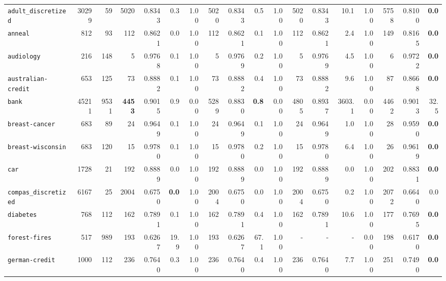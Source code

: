 \begin{tabular}{lccrrrrrrrrrrrrrrr}
\texttt{adult\_discretized} & \multicolumn{1}{r}{30299} & \multicolumn{1}{r}{59}  & 5020 & 0.8343 & 0.3 & 1.00 & 5020 & 0.8343 & 0.5 & 1.00 & 5020 & 0.8343 & 10.1 & 1.00 & 5758 & 0.8100 & \textbf{0.0}\\
\texttt{anneal} & \multicolumn{1}{r}{812} & \multicolumn{1}{r}{93}  & 112 & 0.8621 & 0.0 & 1.00 & 112 & 0.8621 & 0.1 & 1.00 & 112 & 0.8621 & 2.4 & 1.00 & 149 & 0.8165 & \textbf{0.0}\\
\texttt{audiology} & \multicolumn{1}{r}{216} & \multicolumn{1}{r}{148}  & 5 & 0.9768 & 0.1 & 1.00 & 5 & 0.9769 & 0.2 & 1.00 & 5 & 0.9769 & 4.5 & 1.00 & 6 & 0.9722 & \textbf{0.0}\\
\texttt{australian-credit} & \multicolumn{1}{r}{653} & \multicolumn{1}{r}{125}  & 73 & 0.8882 & 0.1 & 1.00 & 73 & 0.8882 & 0.4 & 1.00 & 73 & 0.8882 & 9.6 & 1.00 & 87 & 0.8668 & \textbf{0.0}\\
\texttt{bank} & \multicolumn{1}{r}{45211} & \multicolumn{1}{r}{9531}  & \textbf{4453} & 0.9015 & 0.9 & 0.00 & 5289 & 0.8830 & \textbf{0.8} & 0.00 & 4805 & 0.8937 & 3603.1 & 0.00 & 4462 & 0.9013 & 32.5\\
\texttt{breast-cancer} & \multicolumn{1}{r}{683} & \multicolumn{1}{r}{89}  & 24 & 0.9649 & 0.1 & 1.00 & 24 & 0.9649 & 0.1 & 1.00 & 24 & 0.9649 & 1.0 & 1.00 & 28 & 0.9590 & \textbf{0.0}\\
\texttt{breast-wisconsin} & \multicolumn{1}{r}{683} & \multicolumn{1}{r}{120}  & 15 & 0.9780 & 0.1 & 1.00 & 15 & 0.9780 & 0.2 & 1.00 & 15 & 0.9780 & 6.4 & 1.00 & 26 & 0.9619 & \textbf{0.0}\\
\texttt{car} & \multicolumn{1}{r}{1728} & \multicolumn{1}{r}{21}  & 192 & 0.8889 & 0.0 & 1.00 & 192 & 0.8889 & 0.0 & 1.00 & 192 & 0.8889 & 0.0 & 1.00 & 202 & 0.8831 & \textbf{0.0}\\
\texttt{compas\_discretized} & \multicolumn{1}{r}{6167} & \multicolumn{1}{r}{25}  & 2004 & 0.6750 & \textbf{0.0} & 1.00 & 2004 & 0.6750 & 0.0 & 1.00 & 2004 & 0.6750 & 0.2 & 1.00 & 2072 & 0.6640 & 0.0\\
\texttt{diabetes} & \multicolumn{1}{r}{768} & \multicolumn{1}{r}{112}  & 162 & 0.7891 & 0.1 & 1.00 & 162 & 0.7891 & 0.4 & 1.00 & 162 & 0.7891 & 10.6 & 1.00 & 177 & 0.7695 & \textbf{0.0}\\
\texttt{forest-fires} & \multicolumn{1}{r}{517} & \multicolumn{1}{r}{989}  & 193 & 0.6267 & 19.9 & 1.00 & 193 & 0.6267 & 67.1 & 1.00 & - & - & - & 0.00 & 198 & 0.6170 & \textbf{0.0}\\
\texttt{german-credit} & \multicolumn{1}{r}{1000} & \multicolumn{1}{r}{112}  & 236 & 0.7640 & 0.3 & 1.00 & 236 & 0.7640 & 0.4 & 1.00 & 236 & 0.7640 & 7.7 & 1.00 & 251 & 0.7490 & \textbf{0.0}\\

\end{tabular}
